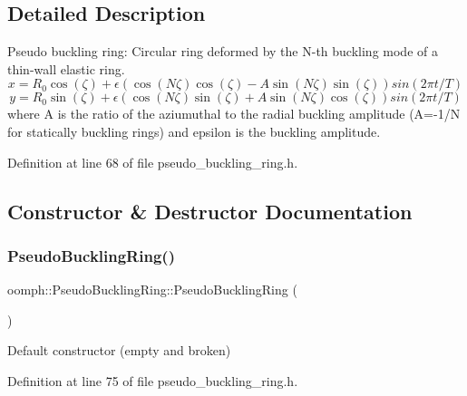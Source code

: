 \subsection{Detailed Description}
Pseudo buckling ring\+: Circular ring deformed by the N-\/th buckling mode of a thin-\/wall elastic ring. \[ x = R_0 \cos(\zeta) + \epsilon \left( \cos(N \zeta) \cos(\zeta) - A \sin(N \zeta) \sin(\zeta) \right) sin(2 \pi t/T) \] \[ y = R_0 \sin(\zeta) + \epsilon \left( \cos(N \zeta) \sin(\zeta) + A \sin(N \zeta) \cos(\zeta) \right) sin(2 \pi t/T) \] where A is the ratio of the aziumuthal to the radial buckling amplitude (A=-\/1/N for statically buckling rings) and epsilon is the buckling amplitude. 

Definition at line 68 of file pseudo\+\_\+buckling\+\_\+ring.\+h.



\subsection{Constructor \& Destructor Documentation}
\mbox{\label{classoomph_1_1PseudoBucklingRing_a7028441632808d2bc24d7f398aff3c6c}} 
\subsubsection{\texorpdfstring{Pseudo\+Buckling\+Ring()}{PseudoBucklingRing()}\hspace{0.1cm}{\footnotesize\ttfamily [1/5]}}
{\footnotesize\ttfamily oomph\+::\+Pseudo\+Buckling\+Ring\+::\+Pseudo\+Buckling\+Ring (\begin{DoxyParamCaption}{ }\end{DoxyParamCaption})\hspace{0.3cm}{\ttfamily [inline]}}



Default constructor (empty and broken) 



Definition at line 75 of file pseudo\+\_\+buckling\+\_\+ring.\+h.

\mbox{\label{classoomph_1_1PseudoBucklingRing_a0c6596032e6f3c5819220dfddbabcb0d}} 
